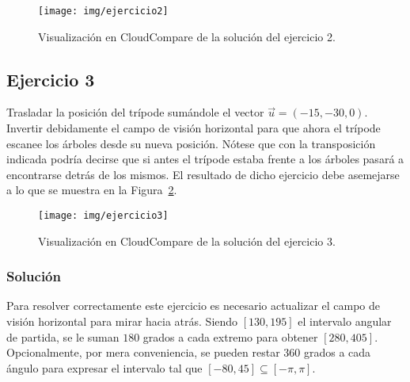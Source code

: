 \documentclass[]{article}
\begin{document}
	\begin{figure}[htb]
		\centering
		\texttt{[image: img/ejercicio2]}
		\caption{Visualización en CloudCompare de la solución del ejercicio 2.}
		\label{fig:ejercicio2}
	\end{figure} 

	
	\pagebreak


	\subsection*{Ejercicio 3}
	Trasladar la posición del trípode sumándole el vector $\vec{u}=(-15, -30, 0)$. Invertir debidamente el campo de visión horizontal para que ahora el trípode escanee los árboles desde su nueva posición. Nótese que con la transposición indicada podría decirse que si antes el trípode estaba frente a los árboles pasará a encontrarse detrás de los mismos. El resultado de dicho ejercicio debe asemejarse a lo que se muestra en la Figura~\ref{fig:ejercicio3}.
	
	\begin{figure}[htb]
		\centering
		\texttt{[image: img/ejercicio3]}
		\caption{Visualización en CloudCompare de la solución del ejercicio 3.}
		\label{fig:ejercicio3}
	\end{figure} 

	\subsubsection*{Solución}
	Para resolver correctamente este ejercicio es necesario actualizar el campo de visión horizontal para mirar hacia atrás. Siendo $[130, 195]$ el intervalo angular de partida, se le suman $180$ grados a cada extremo para obtener $[280, 405]$. Opcionalmente, por mera conveniencia, se pueden restar $360$ grados a cada ángulo para expresar el intervalo tal que $[-80, 45] \subseteq [-\pi, \pi]$.
\end{document}

